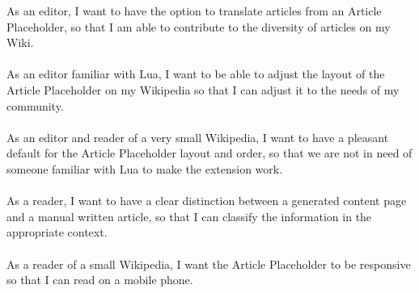 As an editor, I want to have the option to translate articles from an Article Placeholder, so that I am able to contribute to the diversity of articles on my Wiki. \\
\\
As an editor familiar with Lua, I want to be able to adjust the layout of the Article Placeholder on my Wikipedia so that I can adjust it to the needs of my community. \\
\\
As an editor and reader of a very small Wikipedia, I want to have a pleasant default for the Article Placeholder layout and order, so that we are not in need of someone familiar with Lua to make the extension work. \\
\\
As a reader, I want to have a clear distinction between a generated content page and a manual written article, so that I can classify the information in the appropriate context. \\
\\
As a reader of a small Wikipedia, I want the Article Placeholder to be responsive so that I can read on a mobile phone. 